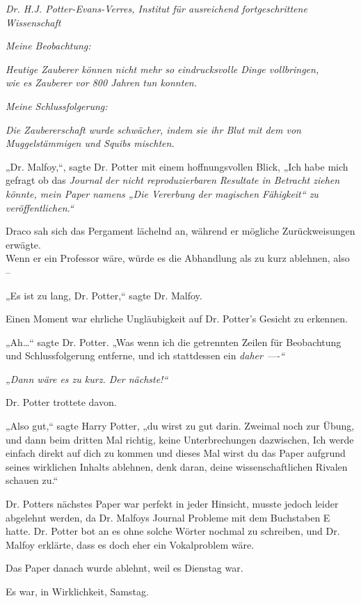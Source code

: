 {\emph{Dr. H.J. Potter-Evans-Verres, Institut für ausreichend fortgeschrittene Wissenschaft}

\emph{Meine Beobachtung:}

\emph{Heutige Zauberer können nicht mehr so eindrucksvolle Dinge vollbringen,}\\ \emph{wie es Zauberer vor 800 Jahren tun konnten.}

\emph{Meine Schlussfolgerung:}

\emph{Die Zaubererschaft wurde schwächer, indem sie ihr Blut mit dem von Muggelstämmigen und Squibs mischten.}

„Dr. Malfoy,“, sagte Dr. Potter mit einem hoffnungsvollen Blick, „Ich habe mich gefragt ob das \emph{Journal der nicht reproduzierbaren Resultate in Betracht ziehen könnte, mein Paper namens „Die Vererbung der magischen Fähigkeit“ zu veröffentlichen.“}

Draco sah sich das Pergament lächelnd an, während er mögliche Zurückweisungen erwägte.\\ Wenn er ein Professor wäre, würde es die Abhandlung als zu kurz ablehnen, also --

„Es ist zu lang, Dr. Potter,“ sagte Dr. Malfoy.

Einen Moment war ehrliche Ungläubigkeit auf Dr. Potter's Gesicht zu erkennen.

„Ah…“ sagte Dr. Potter. „Was wenn ich die getrennten Zeilen für Beobachtung und Schlussfolgerung entferne, und ich stattdessen ein \emph{daher ----“}

\emph{„Dann wäre es zu kurz. Der nächste!“}

Dr. Potter trottete davon.

„Also gut,“ sagte Harry Potter, „du wirst zu gut darin. Zweimal noch zur Übung, und dann beim dritten Mal richtig, keine Unterbrechungen dazwischen, Ich werde einfach direkt auf dich zu kommen und dieses Mal wirst du das Paper aufgrund seines wirklichen Inhalts ablehnen, denk daran, deine wissenschaftlichen Rivalen schauen zu.“

Dr. Potters nächstes Paper war perfekt in jeder Hinsicht, musste jedoch leider abgelehnt werden, da Dr. Malfoys Journal Probleme mit dem Buchstaben E hatte. Dr. Potter bot an es ohne solche Wörter nochmal zu schreiben, und Dr. Malfoy erklärte, dass es doch eher ein Vokalproblem wäre.

Das Paper danach wurde ablehnt, weil es Dienstag war.

Es war, in Wirklichkeit, Samstag.

}
